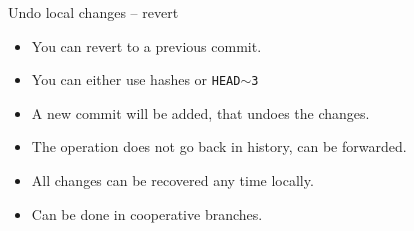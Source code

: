 \documentclass[14pt]{beamer}
\begin{document}
\begin{frame}{Undo local changes -- revert}
	\begin{itemize}
		\item You can revert to a previous commit.
		\item You can either use hashes or \texttt{HEAD$\sim$3}
		\item A new commit will be added, that undoes the changes.
		\item The operation does not go back in history, can be forwarded.
		\item All changes can be recovered any time locally.
		\item Can be done in cooperative branches.
	\end{itemize}
\end{frame}
\end{document}
